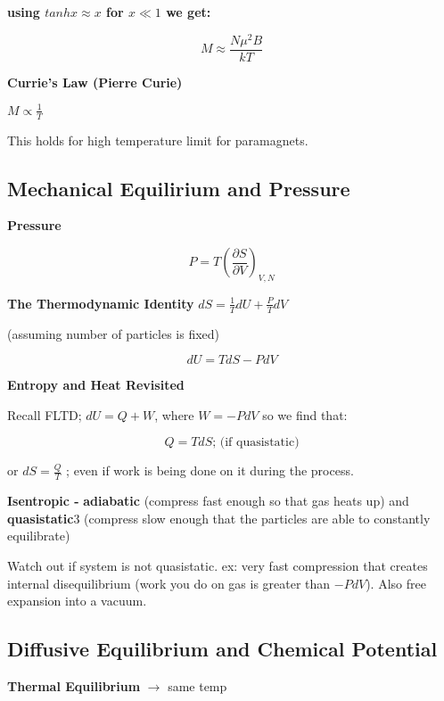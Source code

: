 \textbf{using $tanh{x} \approx x$ for $x \ll 1$ we get:}

\[M \approx \frac{N\mu ^2 B}{kT} \]

\textbf{Currie's Law (Pierre Curie)}

$M \propto \frac{1}{T}$

This holds for high temperature limit for paramagnets.

\subsection{Mechanical Equilirium and Pressure}

\textbf{Pressure}

\begin{equation}
    P = T \left(\frac{\partial S}{\partial V} \right)_{V, N}
\end{equation}


\textbf{The Thermodynamic Identity}
$dS = \frac{1}{T}dU + \frac{P}{T} dV$

(assuming number of particles is fixed)

\begin{equation}
    dU = TdS - PdV
\end{equation}

\textbf{Entropy and Heat Revisited}
\begin{note}
Recall FLTD; $dU = Q + W$, where $W= -PdV$ so we find that:
\end{note}

\begin{equation}
    Q = TdS \text{; (if quasistatic)}
\end{equation}

or $dS = \frac{Q}{T}$ ; even if work is being done on it during the process.

\textbf{Isentropic - } \textbf{adiabatic} (compress fast enough so that gas heats up) and \textbf{quasistatic}3 (compress slow enough that the particles are able to constantly equilibrate)

Watch out if system is not quasistatic. ex: very fast compression that creates internal disequilibrium (work you do on gas is greater than $-PdV$). Also free expansion into a vacuum.

\subsection{Diffusive Equilibrium and Chemical Potential}

\textbf{Thermal Equilibrium} $\rightarrow$ same temp

